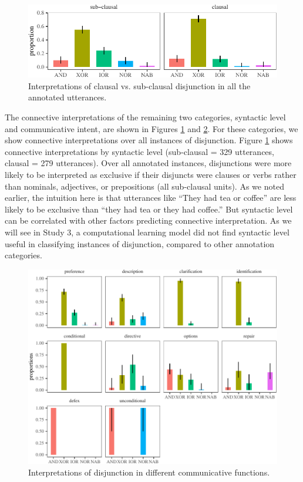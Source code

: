 \documentclass[
  english,
  ,man,floatsintext]{apa6}
\begin{document}
\begin{figure}[tb]

{\centering \includegraphics{figs/syntaxPlot-1} 

}

\caption{Interpretations of clausal vs. sub-clausal disjunction in all the annotated utterances.}\label{fig:syntaxPlot}
\end{figure}

The connective interpretations of the remaining two categories, syntactic level and communicative intent, are shown in Figures \ref{fig:syntaxPlot} and \ref{fig:speechActPlot}. For these categories, we show connective interpretations over all instances of disjunction. Figure \ref{fig:syntaxPlot} shows connective interpretations by syntactic level (sub-clausal = 329 utterances, clausal = 279 utterances). Over all annotated instances, disjunctions were more likely to be interpreted as exclusive if their disjuncts were clauses or verbs rather than nominals, adjectives, or prepositions (all sub-clausal units). As we noted earlier, the intuition here is that utterances like ``They had tea or coffee'' are less likely to be exclusive than ``they had tea or they had coffee.'' But syntactic level can be correlated with other factors predicting connective interpretation. As we will see in Study 3, a computational learning model did not find syntactic level useful in classifying instances of disjunction, compared to other annotation categories.

\begin{figure}[tb]

{\centering \includegraphics{figs/speechActPlot-1} 

}

\caption{Interpretations of disjunction in different communicative functions.}\label{fig:speechActPlot}
\end{figure}
\end{document}
